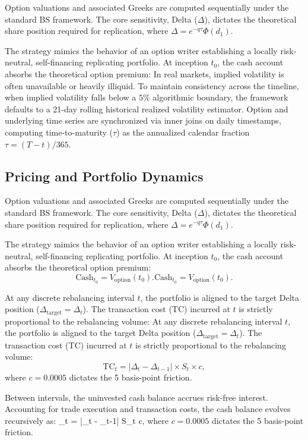 \documentclass{article}
\begin{document}
Option valuations and associated Greeks are computed sequentially under the standard BS framework. The core sensitivity, Delta ($\Delta$), dictates the theoretical share position required for replication, where $\Delta = e^{-q\tau}\Phi(d_1)$. 

The strategy mimics the behavior of an option writer establishing a locally risk-neutral, self-financing replicating portfolio. At inception $t_0$, the cash account absorbs the theoretical option premium:
In real markets, implied volatility is often unavailable or heavily illiquid. To maintain consistency across the timeline, when implied volatility falls below a $5\%$ algorithmic boundary, the framework defaults to a 21-day rolling historical realized volatility estimator. Option and underlying time series are synchronized via inner joins on daily timestamps, computing time-to-maturity ($\tau$) as the annualized calendar fraction $\tau = (T - t) / 365$.

\subsection{Pricing and Portfolio Dynamics}

Option valuations and associated Greeks are computed sequentially under the standard BS framework. The core sensitivity, Delta ($\Delta$), dictates the theoretical share position required for replication, where $\Delta = e^{-q\tau}\Phi(d_1)$. 

The strategy mimics the behavior of an option writer establishing a locally risk-neutral, self-financing replicating portfolio. At inception $t_0$, the cash account absorbs the theoretical option premium:
\[
\text{Cash}_{t_0} = V_{\text{option}}(t_0).
\text{Cash}_{t_0} = V_{\text{option}}(t_0).
\]

At any discrete rebalancing interval $t$, the portfolio is aligned to the target Delta position ($\Delta_{\text{target}} = \Delta_t$). The transaction cost (TC) incurred at $t$ is strictly proportional to the rebalancing volume:
At any discrete rebalancing interval $t$, the portfolio is aligned to the target Delta position ($\Delta_{\text{target}} = \Delta_t$). The transaction cost (TC) incurred at $t$ is strictly proportional to the rebalancing volume:
\[
\text{TC}_t = |\Delta_t - \Delta_{t-1}| \times S_t \times c,
\]
where $c = 0.0005$ dictates the 5 basis-point friction.

Between intervals, the uninvested cash balance accrues risk-free interest. Accounting for trade execution and transaction costs, the cash balance evolves recursively as:
_t = |\Delta_t - \Delta_{t-1}| \times S_t \times c,
\]
where $c = 0.0005$ dictates the 5 basis-point friction.
\end{document}
